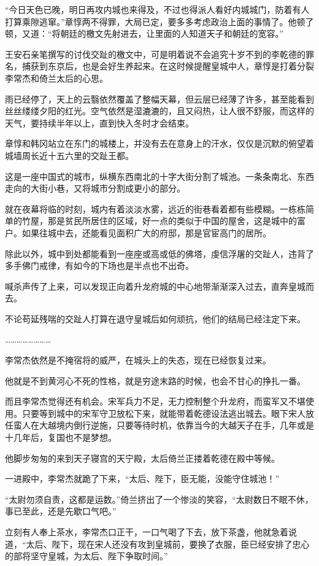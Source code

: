 “今日天色已晚，明日再攻内城也来得及，不过也得派人看好内城城门，防着有人打算乘隙逃窜。”章惇两不得罪，大局已定，要多多考虑政治上面的事情了。他顿了顿，又道：“将朝廷的檄文先射进去，让里面的人知道天子和朝廷的宽容。”

王安石亲笔撰写的讨伐交趾的檄文中，可是明着说不会追究十岁不到的李乾德的罪名，捕获到东京后，也是会好生养起来。在这时候提醒皇城中人，章惇是打着分裂李常杰和倚兰太后的心思。

雨已经停了，天上的云翳依然覆盖了整幅天幕，但云层已经薄了许多，甚至能看到丝丝缕缕夕阳的红光。空气依然是湿漉漉的，且又闷热，让人很不舒服，而这样的天气，要持续半年以上，直到快入冬时才会结束。

章惇和韩冈站立在东门的城楼上，并没有去在意身上的汗水，仅仅是沉默的俯望着城墙周长近十五六里的交趾王都。

这是一座中国式的城市，纵横东西南北的十字大街分割了城池。一条条南北、东西走向的大街小巷，又将城市分割成更小的部分。

就在夜幕将临的时刻，城内有着淡淡水雾，远近的街巷看着都有些模糊。一栋栋简单的竹屋，那是贫民所居住的区域，好一点的类似于中国的屋舍，这是城中的富户。如果往城中去，还能看见面积广大的府邸，那是官宦高门的居所。

除此以外，城中到处都能看到一座座或高或低的佛塔，虔信浮屠的交趾人，违背了多手佛门戒律，有如今的下场也是半点也不出奇。

喊杀声传了上来，可以发现正向着升龙府城的中心地带渐渐深入过去，直奔皇城而去。

不论苟延残喘的交趾人打算在退守皇城后如何顽抗，他们的结局已经注定下来。

……………………

李常杰依然是不掩宿将的威严，在城头上的失态，现在已经恢复过来。

他就是不到黄河心不死的性格，就是穷途末路的时候，也会不甘心的挣扎一番。

而且李常杰觉得还有机会。宋军兵力不足，无力控制整个升龙府，而蛮军又不堪使用。只要等到城中的宋军守卫放松下来，就能带着乾德设法逃出城去。眼下宋人放任蛮人在大越境内倒行逆施，只要等待时机，依靠当今的大越天子在手，几年或是十几年后，复国也不是梦想。

他脚步匆匆的来到天子寝宫的天宁殿，太后倚兰正搂着乾德在殿中等候。

一进殿中，李常杰就跪了下来，“太后、陛下，臣无能，没能守住城池！”

“太尉勿须自责，这都是运数。”倚兰挤出了一个惨淡的笑容，“太尉数日不眠不休，事已至此，还是先歇口气吧。”

立刻有人奉上茶水，李常杰口正干，一口气喝了下去，放下茶盏，他就急着说道，“太后、陛下，现在宋人还没有攻到皇城前，要换了衣服，臣已经安排了忠心的部将坚守皇城，为太后、陛下争取时间。”


